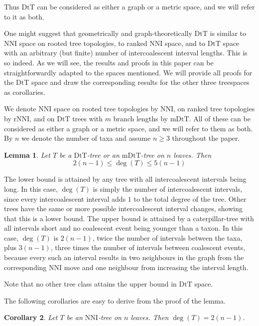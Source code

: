 \documentclass{amsart}
\newtheorem{lemma}{Lemma}
\newtheorem{corollary}[lemma]{Corollary}
\newcommand{\dts}{\mathrm{DtT}}
\newcommand{\nni}{\mathrm{NNI}}
\newcommand{\rnni}{\mathrm{rNNI}}
\newcommand{\mdts}{\mathrm{mDtT}}
\begin{document}
Thus $\dts$ can be considered as either a graph or a metric space, and we will refer to it as both.

One might suggest that geometrically and graph-theoretically $\dts$ is similar to NNI space on rooted tree topologies, to ranked NNI space, and to $\dts$ space with an arbitrary (but finite) number of intercoalescent interval lengths.
This is so indeed.
As we will see, the results and proofs in this paper can be straightforwardly adapted to the spaces mentioned.
We will provide all proofs for the $\dts$ space and draw the corresponding results for the other three treespaces as corollaries.

We denote NNI space on rooted tree topologies by $\nni$, on ranked tree topologies by $\rnni$, and on $\dts$ trees with $m$ branch lengths by $\mdts$.
All of these can be considered as either a graph or a metric space, and we will refer to them as both.
By $n$ we denote the number of taxa and assume $n \geq 3$ throughout the paper.

\begin{lemma}\label{neighBound}
Let $T$ be a $\dts$-tree or an $\mdts$-tree on $n$ leaves. Then \[2(n-1)\leq \deg(T)\leq5(n-1)\]
\end{lemma}

\proof
The lower bound is attained by any tree with all intercoalescent intervals being long.
In this case, $\deg(T)$ is simply the number of intercoalescent intervals, since every intercoalescent interval adds $1$ to the total degree of the tree.
Other trees have the same or more possible intercoalescent interval changes, showing that this is a lower bound.
The upper bound is attained by a caterpillar-tree with all intervals short and no coalescent event being younger than a taxon.
In this case, $\deg(T)$ is $2(n-1)$, twice the number of intervals between the taxa, plus $3(n-1)$, three times the number of intervals between coalescent events, because every such an interval results in two neighbours in the graph from the corresponding NNI move and one neighbour from increasing the interval length.

Note that no other tree class attains the upper bound in $\dts$ space.
\endproof

The following corollaries are easy to derive from the proof of the lemma.

\begin{corollary}
Let $T$ be an $\nni$-tree on $n$ leaves. Then $\deg(T) = 2(n-1)$.
\end{corollary}
\end{document}
